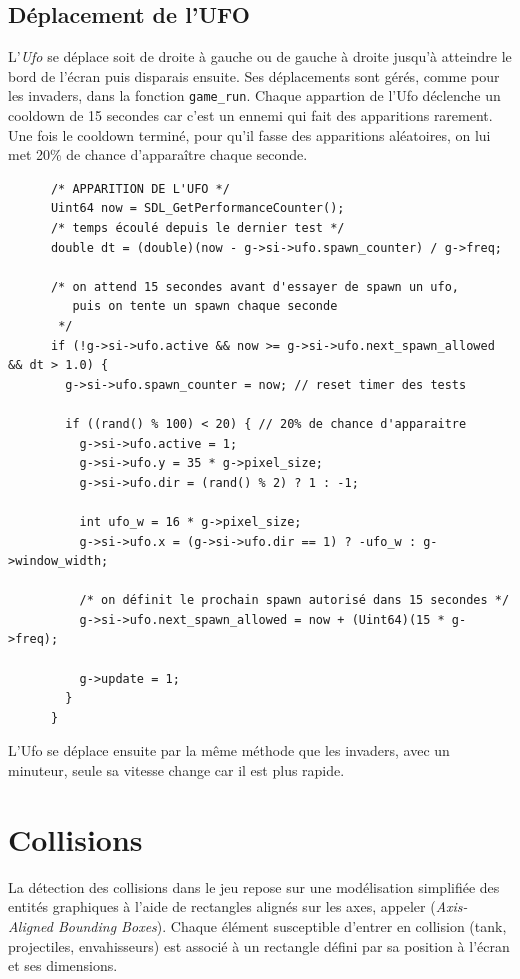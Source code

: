 \documentclass[12pt,a4paper]{report}
\begin{document}
\subsection{Déplacement de l'UFO}
 L'\textit{Ufo} se déplace soit de droite à gauche ou de gauche à droite jusqu'à atteindre le bord de l'écran puis disparais ensuite. 
 Ses déplacements sont gérés, comme pour les invaders, dans la fonction \texttt{game\_run}.
 Chaque appartion de l'Ufo déclenche un cooldown de 15 secondes car c'est un ennemi qui fait des apparitions rarement. Une fois le cooldown terminé, pour qu'il fasse des apparitions aléatoires, on lui met 20\% de chance d'apparaître chaque seconde.
 
\begin{lstlisting}
	  /* APPARITION DE L'UFO */
	  Uint64 now = SDL_GetPerformanceCounter();
	  /* temps écoulé depuis le dernier test */
	  double dt = (double)(now - g->si->ufo.spawn_counter) / g->freq;

	  /* on attend 15 secondes avant d'essayer de spawn un ufo,
	     puis on tente un spawn chaque seconde
	   */
	  if (!g->si->ufo.active && now >= g->si->ufo.next_spawn_allowed && dt > 1.0) {
	    g->si->ufo.spawn_counter = now; // reset timer des tests

	    if ((rand() % 100) < 20) { // 20% de chance d'apparaitre
	      g->si->ufo.active = 1;
	      g->si->ufo.y = 35 * g->pixel_size;
	      g->si->ufo.dir = (rand() % 2) ? 1 : -1;

	      int ufo_w = 16 * g->pixel_size;
	      g->si->ufo.x = (g->si->ufo.dir == 1) ? -ufo_w : g->window_width;

	      /* on définit le prochain spawn autorisé dans 15 secondes */
	      g->si->ufo.next_spawn_allowed = now + (Uint64)(15 * g->freq);

	      g->update = 1;
	    }
	  }
\end{lstlisting}
 
L'Ufo se déplace ensuite par la même méthode que les invaders, avec un minuteur, seule sa vitesse change car il est plus rapide.



\section{Collisions}


La détection des collisions dans le jeu repose sur une modélisation simplifiée des entités graphiques à l’aide de rectangles alignés sur les axes, appeler (\textit{Axis-Aligned Bounding Boxes}).  
Chaque élément susceptible d’entrer en collision (tank, projectiles, envahisseurs) est associé à un rectangle défini par sa position à l’écran et ses dimensions.
\end{document}
